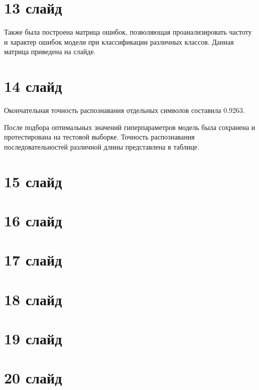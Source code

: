 \documentclass{altsu-report}
\begin{document}
\section*{13 слайд}

Также была построена матрица ошибок, позволяющая проанализировать частоту и 
характер ошибок модели при классификации различных классов. Данная матрица 
приведена на слайде.

\section*{14 слайд}

Окончательная точность распознавания отдельных символов составила 0.9263.

После подбора оптимальных значений гиперпараметров модель была сохранена и 
протестирована на тестовой выборке. Точность распознавания последовательностей 
различной длины представлена в таблице.

\section*{15 слайд}



\section*{16 слайд}

\section*{17 слайд}

\section*{18 слайд}

\section*{19 слайд}

\section*{20 слайд}
    
\end{document}
